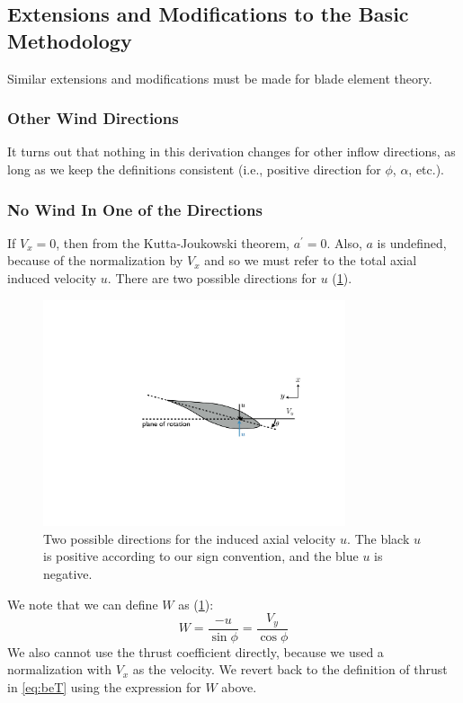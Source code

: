 \documentclass{article}
\begin{document}
\subsection{Extensions and Modifications to the Basic Methodology}

Similar extensions and modifications must be made for blade element theory.

\subsubsection{Other Wind Directions}

It turns out that nothing in this derivation changes for other inflow directions, as long as we keep the definitions consistent (i.e., positive direction for $\phi$, $\alpha$, etc.).


\subsubsection{No Wind In One of the Directions}
\label{sec:nowindtan}

If $V_x = 0$, then from the Kutta-Joukowski theorem, $a^\prime = 0$.  Also, $a$ is undefined, because of the normalization by $V_x$ and so we must refer to the total axial induced velocity $u$.  There are two possible directions for $u$ (\cref{fig:inflowu}).

\begin{figure}[htbp]
    \centering
    \includegraphics[width=3.5in]{figures/inflow4}
    \caption{Two possible directions for the induced axial velocity $u$.  The black $u$ is positive according to our sign convention, and the blue $u$ is negative.}
    \label{fig:inflowu}
\end{figure}

We note that we can define $W$ as (\cref{fig:inflowu}):
\begin{equation}
    W = \frac{-u}{\sin\phi} = \frac{V_y}{\cos\phi}
\end{equation}
We also cannot use the thrust coefficient directly, because we used a normalization with $V_x$ as the velocity.  We revert back to the definition of thrust in \cref{eq:beT} using the expression for $W$ above.
\end{document}
